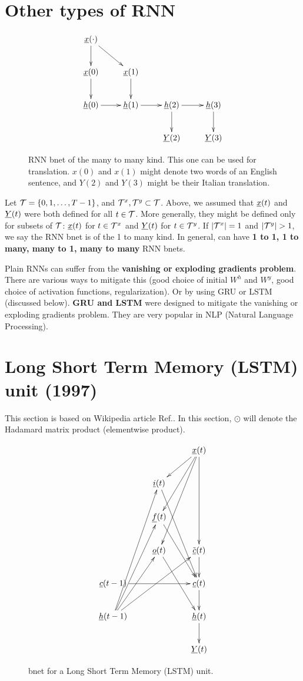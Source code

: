  
\section*{Other types of RNN}

\begin{figure}[h!]
\centering
$$\xymatrix{
\rvx(\cdot)\ar[d]\ar[dr]\\
\rvx(0)\ar[d]&
\rvx(1)\ar[d]&
\\
\rvh(0)\ar[r]&
\rvh(1)\ar[r]&
\rvh(2)\ar[d]\ar[r]&
\rvh(3)\ar[d]\\
&
&
\rvY(2)&
\rvY(3)
}$$
\caption{RNN bnet of the
many to many kind. This
one can be used for  translation.
$x(0)$ and $x(1)$ might
denote two words of an English
sentence, and $Y(2)$ 
and $Y(3)$ might be
their Italian translation.}
\label{fig-rnn-translation}
\end{figure}

Let ${\cal T}=\{0,1, \dots , T-1\}$,
and
${\cal T}^x, {\cal T}^y\subset {\cal T}$.
Above, 
we assumed that 
${\underline{x}}(t)$ and ${\underline{Y}}(t)$
were both defined 
for all $t\in {\cal T}$.
More generally, they 
might be defined only
for subsets of ${\cal T}$:
${\underline{x}}(t)$ for $t\in {\cal T}^x$
and 
${\underline{Y}}(t)$ for $t\in {\cal T}^y$.
If $|{\cal T}^x|=1$ and
$|\calt^y|>1$, 
we say the RNN bnet is of
the 1 to many kind.
In general, can have 
{\bf 1 to 1, 1 to many, many to 1, 
many to many} RNN bnets.

Plain RNNs can suffer 
from the
{\bf vanishing or exploding
 gradients problem}.
There are various ways to
mitigate this (good choice of initial
$W^h$ and $W^y$, 
good choice of activation 
functions, regularization).
Or by using GRU or LSTM (discussed below).
 {\bf GRU and LSTM}
were designed to mitigate the
vanishing or exploding gradients problem.
They are very popular in NLP (Natural
Language Processing).



\newpage

\section*{Long  
Short Term Memory (LSTM) unit (1997)}

This section
is based on Wikipedia article 
Ref.\cite{lstm}. In this section,
$\odot$
will denote the Hadamard matrix product
(elementwise product).

\begin{figure}[h!]
\centering
$$\xymatrix{
&&\rvx(t)\ar[ddd]\ar[dl]\ar[ldd]\ar[lddd]
\\
&\rvi(t)\ar[rddd]
&\\
&\rvf(t)\ar[rdd]&\\
&\rvo(t)\ar[ddr]
&\tilde{\rvc}(t)\ar[d]
\\
\rvc(t-1)\ar[rr]
&&\rvc(t)\ar[d]
\\
\rvh(t-1)\ar[ruuuu]\ar[ruuu]\ar[ruu]\ar[rruu]
&&\rvh(t)\ar[d]\\
&&\rvY(t)
}$$
\caption{
bnet for a Long Short Term Memory
 (LSTM) unit.}
\label{fig-rnn-lstm}
\end{figure}

